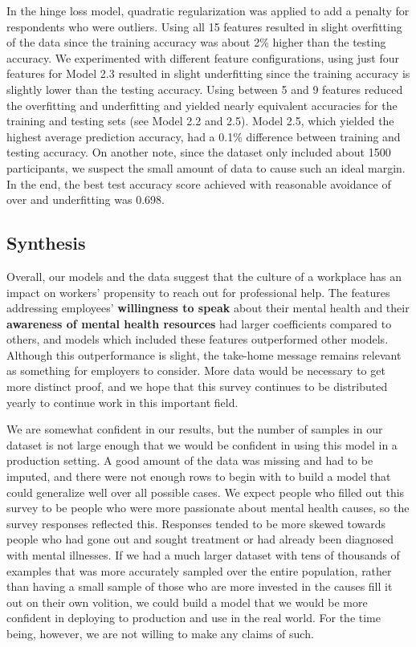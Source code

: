 \documentclass[times, twocolumn]{article}
\begin{document}
In the hinge loss model, quadratic regularization was applied to add a penalty
for respondents who were outliers. Using all 15 features resulted in slight
overfitting of the data since the training accuracy was about 2\% higher than
the testing accuracy. We experimented with different feature configurations,
using just four features for Model 2.3 resulted in slight underfitting since
the training accuracy is slightly lower than the testing accuracy. Using between
5 and 9 features reduced the overfitting and underfitting and yielded nearly
equivalent accuracies for the training and testing sets (see Model 2.2 and 2.5).
Model 2.5, which yielded the highest average prediction accuracy, had a 0.1\%
difference between training and testing accuracy. On another note, since the
dataset only included about 1500 participants, we suspect the small amount of
data to cause such an ideal margin. In the end, the best test accuracy score
achieved with reasonable avoidance of over and underfitting was 0.698.



\subsection{Synthesis}

Overall, our models and the data suggest that the culture of a workplace has an
impact on workers’ propensity to reach out for professional help. The features
addressing employees’ \textbf{willingness to speak} about their mental health
and their \textbf{awareness of mental health resources} had larger coefficients
compared to others, and models which included these features outperformed other
models. Although this outperformance is slight, the take-home message remains
relevant as something for employers to consider. More data would be necessary
to get more distinct proof, and we hope that this survey continues to be
distributed yearly to continue work in this important field.

We are somewhat confident in our results, but the number of samples in our dataset
is not large enough that we would be confident in using this model in a production
setting. A good amount of the data was missing and had to be imputed, and there
were not enough rows to begin with to build a model that could generalize well
over all possible cases. We expect  people who filled out this survey to be people
who were more passionate about mental health causes, so the survey responses
reflected this. Responses  tended to be more skewed towards people who had gone
out and sought treatment or had already been diagnosed with mental illnesses.
If we had a much larger dataset with tens of thousands of examples that was more
accurately sampled over the entire population, rather than having a small sample
of those who are more invested in the causes fill it out on their own volition,
we could build a model that we would be more confident in deploying to production
and use in the real world. For the time being, however, we are not willing to make
any claims of such.
\end{document}
